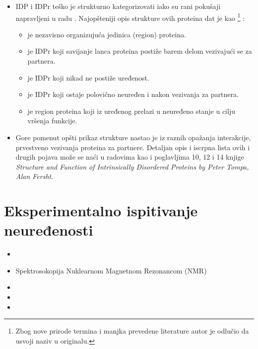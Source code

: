 \begin{itemize}
  \item 
    IDP i IDPr teško je strukturno kategorizovati \parencite{dunker2001,
      oldfield2014} iako su rani pokušaji napravljeni u radu \parencite{dunker2001}.
      Najopšteniji opis strukture ovih proteina dat je kao
      \footnote{ Zbog nove
        prirode termina i manjka prevedene literature autor je odlučio da
      usvoji naziv u originalu.} \parencite{uversky2016}:
    \begin{itemize}
      \item {}  je nezavisno organizujuća jedinica (region) proteina.
      \item {}  je IDPr koji savijanje lanca proteina postiže barem delom vezivajući se za partnera. 
      \item {}  je IDPr koji nikad ne postiže uređenost.
      \item {}  je IDPr koji ostaje polovično neuređen i nakon vezivanja za partnera.
      \item {}  je region proteina koji iz uređenog prelazi u neuređeno stanje u cilju vršenja funkcije.
    \end{itemize}

  \item 
    Gore pomenut opšti prikaz strukture nastao je iz raznih opažanja
    interakcije, prvestveno vezivanja proteina za partnere.
    Detaljan opis i iscrpna lista ovih i drugih pojava može se naći u radovima
    \cite{a2z, uversky2016} kao i poglavljima 10, 12 i 14 knjige
    \textit{Structure and Function of Intrinsically Disordered Proteins by
    Peter Tompa, Alan Fersht}.

\end{itemize}

\section{Eksperimentalno ispitivanje neuređenosti}

\begin{itemize}
  \item {} 
  \item Spektrosokopija Nuklearnom Magnetnom Rezonancom (NMR) 
  \item {}
  \item {}
  \item {}
\end{itemize}


